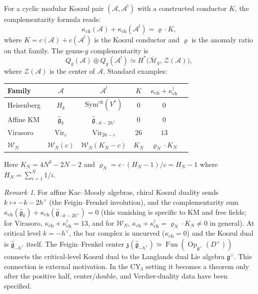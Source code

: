 \documentclass[11pt]{article}
\theoremstyle{definition}
\theoremstyle{remark}
\newtheorem{remark}[theorem]{Remark}
\DeclareMathOperator{\Op}{Op}
\DeclareMathOperator{\Fun}{Fun}
\newcommand{\fkg}{\mathfrak{g}}
\newcommand{\cA}{\mathcal{A}}
\newcommand{\cM}{\mathcal{M}}
\newcommand{\cW}{\mathcal{W}}
\newcommand{\cZ}{\mathcal{Z}}
\begin{document}
For a cyclic modular Koszul pair $(\cA, \cA^!)$ with a constructed
conductor $K$, the complementarity formula reads:
\begin{equation}\label{eq:complementarity}
\kappa_{\mathrm{ch}}(\cA) + \kappa_{\mathrm{ch}}(\cA^!) = \varrho \cdot K,
\end{equation}
where $K = c(\cA) + c(\cA^!)$ is the Koszul conductor and
$\varrho$ is the anomaly ratio on that family. The genus-$g$
complementarity is
\[
Q_g(\cA) \oplus Q_g(\cA^!)
\simeq H^*\bigl(\overline{\cM}_g,\, \cZ(\cA)\bigr),
\]
where $\cZ(\cA)$ is the center of $\cA$. Standard examples:
\begin{center}
\renewcommand{\arraystretch}{1.3}
\begin{tabular}{lccccc}
Family & $\cA$ & $\cA^!$ & $K$ & $\kappa_{\mathrm{ch}} + \kappa_{\mathrm{ch}}^!$ \\
\hline
Heisenberg & $H_k$ & $\mathrm{Sym}^{\mathrm{ch}}(V^*)$ & $0$ & $0$ \\
Affine KM & $\widehat{\fkg}_k$ & $\widehat{\fkg}_{-k-2h^\vee}$ & $0$
& $0$ \\
Virasoro & $\mathrm{Vir}_c$ & $\mathrm{Vir}_{26-c}$ & $26$ & $13$ \\
$\cW_N$ & $\cW_N(c)$ & $\cW_N(K_N - c)$ & $K_N$ &
$\varrho_N \cdot K_N$ \\
\end{tabular}
\end{center}
Here $K_N = 4N^3 - 2N - 2$ and $\varrho_N = c \cdot (H_N - 1)/ c =
H_N - 1$ where $H_N = \sum_{i=1}^N 1/i$.

\begin{remark}
For affine Kac--Moody algebras, chiral Koszul duality sends
$k \mapsto -k - 2h^\vee$ (the Feigin--Frenkel involution), and the
complementarity sum $\kappa_{\mathrm{ch}}(\widehat{\fkg}_k) + \kappa_{\mathrm{ch}}(\widehat{\fkg}_{-k-2h^\vee}) = 0$
(this vanishing is specific to KM and free fields; for Virasoro,
$\kappa_{\mathrm{ch}} + \kappa_{\mathrm{ch}}^! = 13$, and for $\cW_N$,
$\kappa_{\mathrm{ch}} + \kappa_{\mathrm{ch}}^! = \varrho_N \cdot K_N \neq 0$ in general).
At critical level
$k = -h^\vee$, the bar complex is uncurved ($\kappa_{\mathrm{ch}} = 0$) and the
Koszul dual is $\widehat{\fkg}_{-h^\vee}$ itself. The Feigin--Frenkel
center $\mathfrak{z}(\widehat{\fkg}_{-h^\vee}) \simeq
\Fun(\Op_{\fkg^\vee}(D^\times))$ connects the critical-level Koszul
dual to the Langlands dual Lie algebra $\fkg^\vee$.
This connection is external motivation. In the CY$_3$ setting it becomes
a theorem only after the positive half, center/double, and
Verdier-duality data have been specified.
\end{remark}
\end{document}
